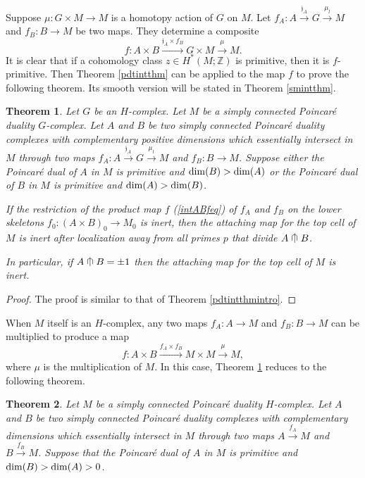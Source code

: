 \documentclass[a4]{amsart}
\newtheorem{theorem}{Theorem}[section]
\theoremstyle{definition}
\newcommand{\testcap}{\mathrel{\vcenter{\offinterlineskip
\hbox{$\cap$}\vskip-1.8ex\hbox{$\kern0.2em | \kern0.15em$}}}}
\begin{document}
\begin{sloppypar}
Suppose $\mu: G\times M\stackrel{}{\longrightarrow} M$ is a homotopy action of $G$ on $M$. 
Let $f_A: A\stackrel{\mathfrak{j}_A}{\longrightarrow}G\stackrel{\mu_l}{\longrightarrow} M$ and $f_B: B\longrightarrow M$ be two maps. They determine a composite
\begin{equation}\label{intABfeq}
f: A\times B \stackrel{\mathfrak{j}_A\times f_B}{\longrightarrow} G\times M\stackrel{\mu}{\longrightarrow} M.
\end{equation}
It is clear that if a cohomology class $z\in H^\ast(M;\mathbb{Z})$ is primitive, then it is $f$-primitive. 
Then Theorem \ref{pdtintthm} can be applied to the map $f$ to prove the following theorem.  Its smooth version will be stated in Theorem \ref{smintthm}. 
  
\begin{theorem}\label{intthm}
Let $G$ be an $H$-complex. 
Let $M$ be a simply connected Poincar\'{e} duality $G$-complex. 
Let $A$ and $B$ be two simply connected Poincar\'{e} duality complexes with complementary  positive dimensions which essentially intersect in $M$ through two maps $f_A: A\stackrel{\mathfrak{j}_A}{\longrightarrow} G\stackrel{\mu_l}{\longrightarrow}M$ and $f_B: B\stackrel{}{\longrightarrow} M$. 
Suppose either the Poincar\'{e} dual of $A$ in $M$ is primitive and ${\rm dim}(B)>{\rm dim}(A)$ or the Poincar\'{e} dual of $B$ in $M$ is primitive and ${\rm dim}(A)>{\rm dim}(B)$. 

If the restriction of the product map $f$ (\ref{intABfeq}) of $f_A$ and $f_B$ on the lower skeletons 
$
f_0: (A\times B)_0\stackrel{}{\longrightarrow} M_0
$ 
is inert, 
then the attaching map for the top cell of $M$ is inert after localization away from all primes $p$ that divide $A\testcap B$.

In particular, if $A\testcap B=\pm 1$ then the attaching map for the top cell of $M$ is inert. 
\end{theorem}
\begin{proof}
The proof is similar to that of Theorem \ref{pdtintthmintro}.
\end{proof}


When $M$ itself is an $H$-complex, any two maps $f_A: A\stackrel{}{\longrightarrow} M$ and $f_B: B\longrightarrow M$ can be multiplied to produce a map
\begin{equation}\label{MHintABfeq}
f: A\times B \stackrel{f_A\times f_B}{\longrightarrow} M\times M\stackrel{\mu}{\longrightarrow} M,
\end{equation}
where $\mu$ is the multiplication of $M$. 
In this case, Theorem \ref{intthm} reduces to the following theorem. 
\begin{theorem}\label{MHintthm}
Let $M$ be a simply connected Poincar\'{e} duality $H$-complex. 
Let $A$ and $B$ be two simply connected Poincar\'{e} duality complexes with complementary dimensions which essentially intersect in $M$ through two maps $A\stackrel{f_A}{\longrightarrow}M$ and $B\stackrel{f_B}{\longrightarrow} M$. Suppose that the Poincar\'{e} dual of $A$ in $M$ is primitive and ${\rm dim}(B)>{\rm dim}(A)>0$.


\end{theorem}
\end{sloppypar}
\end{document}
